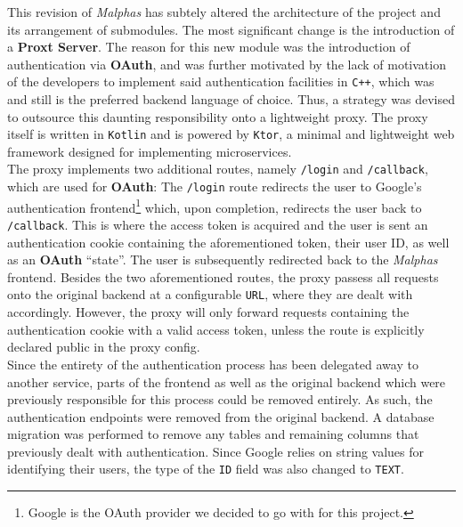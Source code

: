 This revision of \textit{Malphas} has subtely altered the architecture of the project and its arrangement of submodules.
The most significant change is the introduction of a \textbf{Proxt Server}. The reason for this new module was the introduction
of authentication via \textbf{OAuth}, and was further motivated by the lack of motivation of the developers to implement said
authentication facilities in \verb|C++|, which was and still is the preferred backend language of choice. Thus, a strategy
was devised to outsource this daunting responsibility onto a lightweight proxy. The proxy itself is written in \verb|Kotlin|
and is powered by \verb|Ktor|, a minimal and lightweight web framework designed for implementing microservices. \\[\baselineskip]
The proxy implements two additional routes, namely \verb|/login| and \verb|/callback|, which are used for \textbf{OAuth}:
The \verb|/login| route redirects the user to Google's authentication frontend\footnote{
	Google is the OAuth provider we decided to go with for this project.
} which, upon completion, redirects the user back to \verb|/callback|. This is where the access token is acquired and
the user is sent an authentication cookie containing the aforementioned token, their user ID, as well as an \textbf{OAuth}
``state''. The user is subsequently redirected back to the \textit{Malphas} frontend.
Besides the two aforementioned routes, the proxy passess all requests onto the original backend at a configurable \verb|URL|,
where they are dealt with accordingly. However, the proxy will only forward requests containing the authentication cookie
with a valid access token, unless the route is explicitly declared public in the proxy config. \\[\baselineskip]
Since the entirety of the authentication process has been delegated away to another service, parts of the frontend as
well as the original backend which were previously responsible for this process could be removed entirely. As such,
the authentication endpoints were removed from the original backend. A database migration was performed to remove any
tables and remaining columns that previously dealt with authentication. Since Google relies on string values for identifying
their users, the type of the \verb|ID| field was also changed to \verb|TEXT|. 
